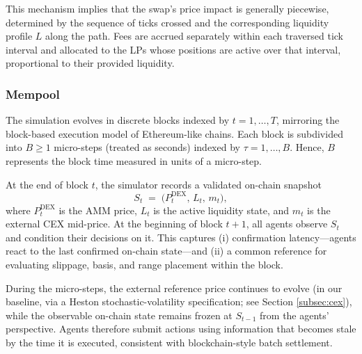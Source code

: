\documentclass[11pt]{article}
\begin{document}
This mechanism implies that the swap's price impact is generally piecewise, determined by the sequence of ticks crossed and the corresponding liquidity profile $L$ along the path. Fees are accrued separately within each traversed tick interval and allocated to the LPs whose positions are active over that interval, proportional to their provided liquidity.

\subsubsection{Mempool}
\label{subsubsec:mempool}

The simulation evolves in discrete blocks indexed by $t=1,\dots,T$, mirroring the
block-based execution model of Ethereum-like chains. Each block is subdivided into
$B\ge 1$ micro-steps (treated as seconds) indexed by $\tau=1,\dots,B$. Hence, $B$ represents the block time measured in units of a micro-step. 


At the end of block $t$, the simulator records a validated on-chain snapshot
\[
  S_t \;=\; \bigl(P_t^{\mathrm{DEX}},\, L_t,\, m_t\bigr),
\]
where $P_t^{\mathrm{DEX}}$ is the AMM price, $L_t$ is the active liquidity state, and
$m_t$ is the external CEX mid-price. At the beginning of block $t+1$, all agents
observe $S_t$ and condition their decisions on it.
This captures (i) confirmation latency—agents react to the last confirmed on-chain
state—and (ii) a common reference for evaluating slippage, basis, and range placement
within the block.


During the micro-steps, the external reference price continues to
evolve (in our baseline, via a Heston stochastic-volatility specification; see
Section \ref{subsec:cex}), while the observable on-chain state remains frozen
at $S_{t-1}$ from the agents' perspective. Agents therefore submit actions using
information that becomes stale by the time it is executed, consistent with
blockchain-style batch settlement.
\end{document}
